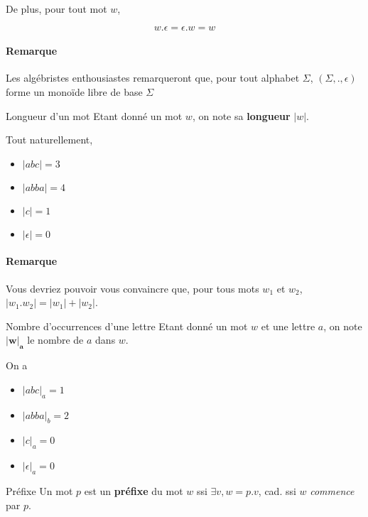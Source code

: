  De plus, pour tout mot $w$, 

\[
    w.\epsilon = \epsilon.w = w
\]

\paragraph{Remarque} Les algébristes enthousiastes remarqueront que, pour tout alphabet $\Sigma$, $(\Sigma,.,\epsilon)$ forme un monoïde libre de base $\Sigma$


\begin{definition}{Longueur d'un mot}{}
Etant donné un mot $w$, on note sa \textbf{longueur} $|w|$.
\end{definition}

\begin{example}
Tout naturellement,
\begin{itemize}
    \item $|abc| = 3$
    \item $|abba| = 4$
    \item $|c| = 1$
    \item $|\epsilon| = 0$
\end{itemize}
\end{example}

\paragraph{Remarque} Vous devriez pouvoir vous convaincre que, pour tous mots $w_1$ et $w_2$, $|w_1.w_2| = |w_1| + |w_2|$. 

\begin{definition}{Nombre d'occurrences d'une lettre}{}
Etant donné un mot $w$ et une lettre $a$, on note $\mathbf{|w|_a}$ le nombre de $a$ dans $w$.
\end{definition}

\begin{example}
On a 
\begin{itemize}
    \item $|abc|_a = 1$
    \item $|abba|_b = 2$
    \item $|c|_a = 0$
    \item $|\epsilon|_a = 0$
\end{itemize}
\end{example}

\begin{definition}{Préfixe}{}
Un mot $p$ est un \textbf{préfixe} du mot $w$ ssi $\exists v, w = p.v$, cad. ssi $w$ \textit{commence} par $p$.
\end{definition}

